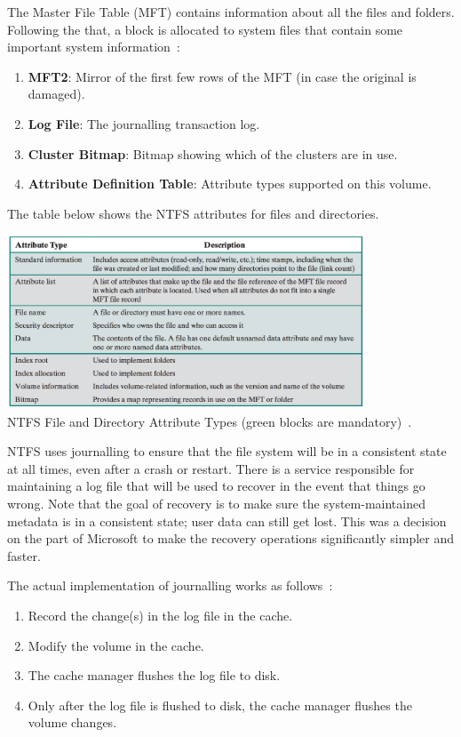 The Master File Table (MFT) contains information about all the files and folders. Following the that, a block is allocated to system files that contain some important system information~\cite{osi}:

\begin{enumerate}
	\item \textbf{MFT2}: Mirror of the first few rows of the MFT (in case the original is damaged).
	\item \textbf{Log File}: The journalling transaction log.
	\item \textbf{Cluster Bitmap}: Bitmap showing which of the clusters are in use.
	\item \textbf{Attribute Definition Table}: Attribute types supported on this volume.
\end{enumerate}

The table below shows the NTFS attributes for files and directories.

\begin{center}
	\includegraphics[width=0.8\textwidth]{images/ntfs-attrs.png}\\
	NTFS File and Directory Attribute Types (green blocks are mandatory)~\cite{osi}.
\end{center}

NTFS uses journalling to ensure that the file system will be in a consistent state at all times, even after a crash or restart. There is a service responsible for maintaining a log file that will be used to recover in the event that things go wrong.  Note that the goal of recovery is to make sure the system-maintained metadata is in a consistent state; user data can still get lost. This was a decision on the part of Microsoft to make the recovery operations significantly simpler and faster.

The actual implementation of journalling works as follows~\cite{russ}:

\begin{enumerate}
	\item Record the change(s) in the log file in the cache.
	\item Modify the volume in the cache.
	\item The cache manager flushes the log file to disk.
	\item Only after the log file is flushed to disk, the cache manager flushes the volume changes.
\end{enumerate}

